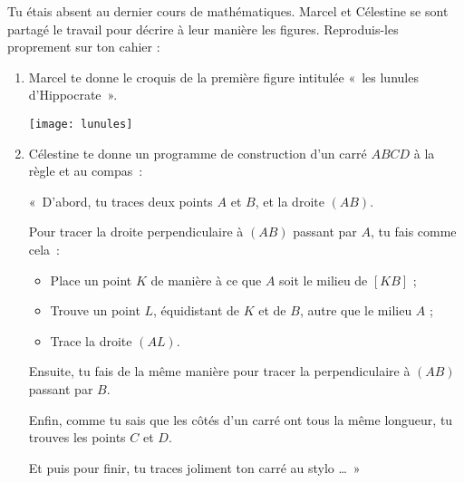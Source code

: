 \begin{exercice}
Tu étais absent au dernier cours de mathématiques. Marcel et Célestine se sont partagé le travail pour décrire à leur manière les figures. Reproduis-les proprement sur ton cahier :
\begin{enumerate}
 \item Marcel te donne le croquis de la première figure intitulée « les lunules d'Hippocrate ».
 \begin{center} \texttt{[image: lunules]} \end{center}
 \item Célestine te donne un programme de construction d'un carré $ABCD$ à la règle et au compas :
 
« D'abord, tu traces deux points $A$ et $B$, et la droite $(AB)$.

Pour tracer la droite perpendiculaire à $(AB)$ passant par $A$, tu fais comme cela :
 \begin{itemize}
  \item Place un point $K$ de manière à ce que $A$ soit le milieu de $[KB]$ ;
  \item Trouve un point $L$, équidistant de $K$ et de $B$, autre que le milieu $A$ ;
  \item Trace la droite $(AL)$.
  \end{itemize}
Ensuite, tu fais de la même manière pour tracer la perpendiculaire à $(AB)$ passant par $B$.
  
Enfin, comme tu sais que les côtés d'un carré ont tous la même longueur, tu trouves les points $C$ et $D$.

Et puis pour finir, tu traces joliment ton carré au stylo … »
 \end{enumerate}
\end{exercice}


